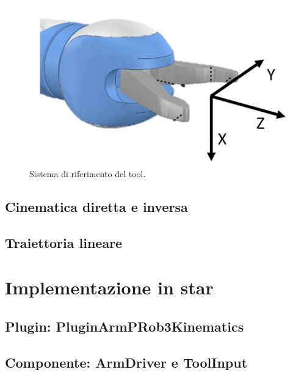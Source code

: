 \begin{figure}[tbh]
	\centering
	\includegraphics[width=0.5\linewidth]{./ImageFiles/prob_frame_tool.jpg}
	\caption{Sistema di riferimento del tool.}
	\label{fig:tool_frame}
\end{figure}

\section{Cinematica diretta e inversa}
\section{Traiettoria lineare}

\chapter{Implementazione in star} 
\section{Plugin: PluginArmPRob3Kinematics}
\section{Componente: ArmDriver e ToolInput}
